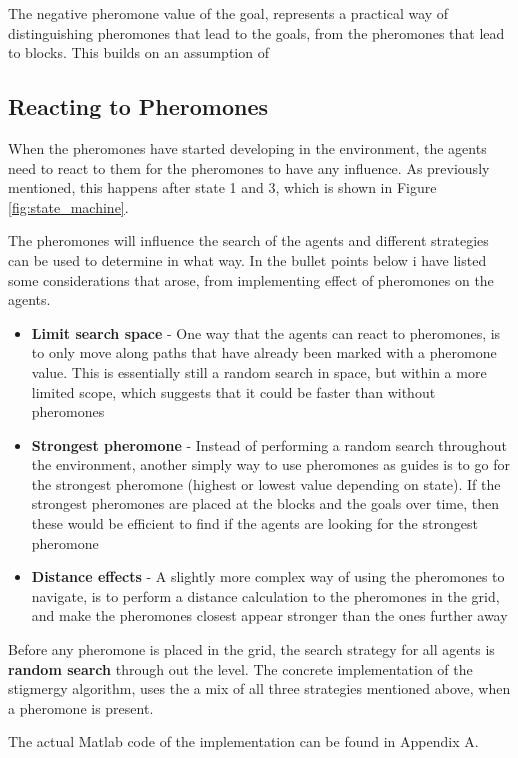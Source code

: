 The negative pheromone value of the goal, represents a practical way of distinguishing pheromones that lead to the goals, from the pheromones that lead to blocks. This builds on an assumption of 

\subsection{Reacting to Pheromones}
When the pheromones have started developing in the environment, the agents need to react to them for the pheromones to have any influence. As previously mentioned, this happens after state 1 and 3, which is shown in Figure \ref{fig:state_machine}. 

The pheromones will influence the search of the agents and different strategies can be used to determine in what way. In the bullet points below i have listed some considerations that arose, from implementing effect of pheromones on the agents.

\begin{itemize}
\item{\textbf{Limit search space} - One way that the agents can react to pheromones, is to only move along paths that have already been marked with a pheromone value. This is essentially still a random search in space, but within a more limited scope, which suggests that it could be faster than without pheromones}
\item{\textbf{Strongest pheromone} - Instead of performing a random search throughout the environment, another simply way to use pheromones as guides is to go for the strongest pheromone (highest or lowest value depending on state). If the strongest pheromones are placed at the blocks and the goals over time, then these would be efficient to find if the agents are looking for the strongest pheromone}
\item{\textbf{Distance effects} - A slightly more complex way of using the pheromones to navigate, is to perform a distance calculation to the pheromones in the grid, and make the pheromones closest appear stronger than the ones further away}
\end{itemize}

Before any pheromone is placed in the grid, the search strategy for all agents is \textbf{random search} through out the level. The concrete implementation of the stigmergy algorithm, uses the a mix of all three strategies mentioned above, when a pheromone is present. 

The actual Matlab code of the implementation can be found in Appendix A.


